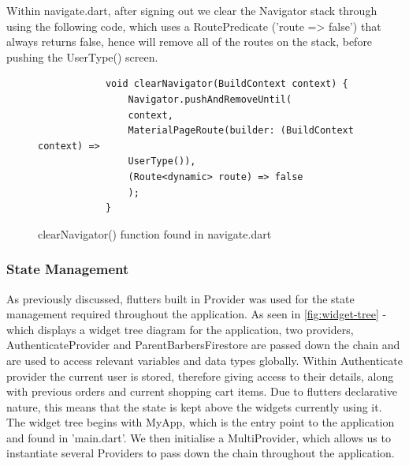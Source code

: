 \documentclass[12pt]{article}
\begin{document}
	Within navigate.dart, after signing out we clear the Navigator stack through using the following code, which uses a RoutePredicate ('route => false') that always returns false, hence will remove all of the routes on the stack, before pushing the UserType() screen.
	\begin{figure}[H]
		\centering
		\label{fig:clear-nav}
		\begin{verbatim}
			void clearNavigator(BuildContext context) {
				Navigator.pushAndRemoveUntil(
				context,
				MaterialPageRoute(builder: (BuildContext context) => 
				UserType()),
				(Route<dynamic> route) => false
				);
			}
		\end{verbatim}
		\caption{clearNavigator() function found in navigate.dart}
	\end{figure}
	
	
	
	
	\subsubsection{State Management}
	
	As previously discussed, flutters built in Provider was used for the state management required throughout the application. As seen in \autoref{fig:widget-tree} - which displays a widget tree diagram for the application, two providers, AuthenticateProvider and ParentBarbersFirestore are passed down the chain and are used to access relevant variables and data types globally. Within Authenticate provider the current user is stored, therefore giving access to their details, along with previous orders and current shopping cart items. Due to flutters declarative nature, this means that the state is kept above the widgets currently using it. The widget tree begins with MyApp, which is the entry point to the application and found in 'main.dart'. We then initialise a MultiProvider, which allows us to instantiate several Providers to pass down the chain throughout the application.
	
\end{document}

